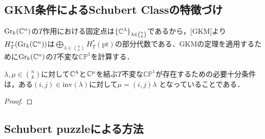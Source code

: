 \subsection{GKM条件によるSchubert Classの特徴づけ}

$\text{Gr}_k(\mathbb{C}^n)$の$T$作用における固定点は$\{\mathbb{C}^\lambda\}_{\lambda\in\binom{n}{k}}$であるから，[GKM]より$H^*_T(\text{Gr}_k(\mathbb{C}^n))$は$\bigoplus_{\lambda\in\binom{n}{k}}H^*_T(\text{pt})$の部分代数である．GKMの定理を適用するために$\text{Gr}_k(\mathbb{C}^n)$の$T$不変な$\mathbb{CP}^1$を計算する．

\begin{prop}
  $\lambda,\mu\in\binom{n}{k}$に対して$\mathbb{C}^\lambda$と$\mathbb{C}^\mu$を結ぶ$T$不変な$\mathbb{CP}^1$が存在するための必要十分条件は，ある$(i, j)\in\text{inv}(\lambda)$に対して$\mu = (i, j)\lambda$
  となっていることである．
\end{prop}

\begin{proof}
  
\end{proof}






\subsection{Schubert puzzleによる方法}

